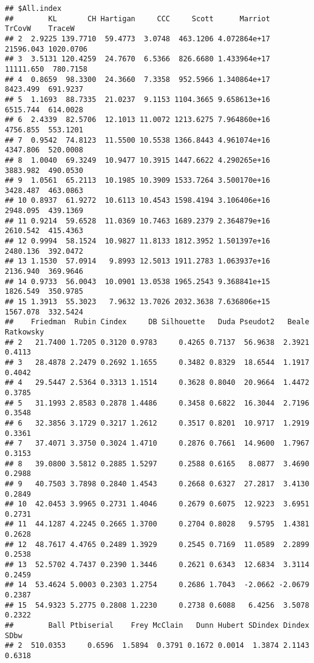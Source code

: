 \documentclass[
]{article}
\begin{document}
\begin{verbatim}
## $All.index
##        KL       CH Hartigan     CCC     Scott      Marriot    TrCovW    TraceW
## 2  2.9225 139.7710  59.4773  3.0748  463.1206 4.072864e+17 21596.043 1020.0706
## 3  3.5131 120.4259  24.7670  6.5366  826.6680 1.433964e+17 11111.650  780.7158
## 4  0.8659  98.3300  24.3660  7.3358  952.5966 1.340864e+17  8423.499  691.9237
## 5  1.1693  88.7335  21.0237  9.1153 1104.3665 9.658613e+16  6515.744  614.0028
## 6  2.4339  82.5706  12.1013 11.0072 1213.6275 7.964860e+16  4756.855  553.1201
## 7  0.9542  74.8123  11.5500 10.5538 1366.8443 4.961074e+16  4347.806  520.0008
## 8  1.0040  69.3249  10.9477 10.3915 1447.6622 4.290265e+16  3883.982  490.0530
## 9  1.0561  65.2113  10.1985 10.3909 1533.7264 3.500170e+16  3428.487  463.0863
## 10 0.8937  61.9272  10.6113 10.4543 1598.4194 3.106406e+16  2948.095  439.1369
## 11 0.9214  59.6528  11.0369 10.7463 1689.2379 2.364879e+16  2610.542  415.4363
## 12 0.9994  58.1524  10.9827 11.8133 1812.3952 1.501397e+16  2480.136  392.0472
## 13 1.1530  57.0914   9.8993 12.5013 1911.2783 1.063937e+16  2136.940  369.9646
## 14 0.9733  56.0043  10.0901 13.0538 1965.2543 9.368841e+15  1826.549  350.9785
## 15 1.3913  55.3023   7.9632 13.7026 2032.3638 7.636806e+15  1567.078  332.5424
##    Friedman  Rubin Cindex     DB Silhouette   Duda Pseudot2   Beale Ratkowsky
## 2   21.7400 1.7205 0.3120 0.9783     0.4265 0.7137  56.9638  2.3921    0.4113
## 3   28.4878 2.2479 0.2692 1.1655     0.3482 0.8329  18.6544  1.1917    0.4042
## 4   29.5447 2.5364 0.3313 1.1514     0.3628 0.8040  20.9664  1.4472    0.3785
## 5   31.1993 2.8583 0.2878 1.4486     0.3458 0.6822  16.3044  2.7196    0.3548
## 6   32.3856 3.1729 0.3217 1.2612     0.3517 0.8201  10.9717  1.2919    0.3361
## 7   37.4071 3.3750 0.3024 1.4710     0.2876 0.7661  14.9600  1.7967    0.3153
## 8   39.0800 3.5812 0.2885 1.5297     0.2588 0.6165   8.0877  3.4690    0.2988
## 9   40.7503 3.7898 0.2840 1.4543     0.2668 0.6327  27.2817  3.4130    0.2849
## 10  42.0453 3.9965 0.2731 1.4046     0.2679 0.6075  12.9223  3.6951    0.2731
## 11  44.1287 4.2245 0.2665 1.3700     0.2704 0.8028   9.5795  1.4381    0.2628
## 12  48.7617 4.4765 0.2489 1.3929     0.2545 0.7169  11.0589  2.2899    0.2538
## 13  52.5702 4.7437 0.2390 1.3446     0.2621 0.6343  12.6834  3.3114    0.2459
## 14  53.4624 5.0003 0.2303 1.2754     0.2686 1.7043  -2.0662 -2.0679    0.2387
## 15  54.9323 5.2775 0.2808 1.2230     0.2738 0.6088   6.4256  3.5078    0.2322
##        Ball Ptbiserial    Frey McClain   Dunn Hubert SDindex Dindex   SDbw
## 2  510.0353     0.6596  1.5894  0.3791 0.1672 0.0014  1.3874 2.1143 0.6318

\end{verbatim}
\end{document}
